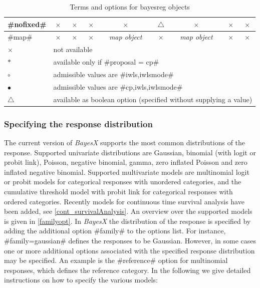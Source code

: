 \begin{table}
\begin{tabular}{|l||c|c|c|c|c|c|c|c|}
\hline
#nofixed#   & $\times$   & $\times$   & $\times$ & $\times$ & $\triangle$ & $\times$ & $\times$ & $\times$\\
\hline
#map#      & $\times$   & $\times$     & $\times$  & {\em map object}  & $\times$  & {\em map object} & $\times$ & $\times$ \\
\hline \hline
$\times$    & \multicolumn{8}{l|}{not available} \\
\hline
$\ast$  & \multicolumn{8}{l|}{available only if #proposal = cp#} \\
\hline
$\circ$  & \multicolumn{8}{l|}{admissible values are #iwls,iwlsmode#} \\
\hline
$\bullet$  & \multicolumn{8}{l|}{admissible values are #cp,iwls,iwlsmode#} \\
\hline
$\triangle$   & \multicolumn{8}{l|}{available as boolean option (specified without supplying a value)} \\
\hline

\end{tabular}
{\em\centering \caption{\label{termsoptions} Terms and options for
bayesreg objects}}
\end{table}

\clearpage

\subsubsection{Specifying the response distribution}
\label{familysyntax}

The current version of {\em BayesX} supports the most common
distributions of the response. Supported univariate distributions
are Gaussian, binomial (with logit or probit link), Poisson,
negative binomial, gamma, zero inflated Poisson and zero inflated
negative binomial. Supported multivariate models are
multinomial logit or probit models for categorical responses with
unordered categories, and the cumulative threshold model with
probit link for categorical responses with ordered categories.
Recently models for continuous time survival analysis have been
added, see \autoref{cont_survivalAnalysis}. An overview over the
supported models is given in \autoref{familyopt}. In {\em BayesX}
the distribution of the response is specified by adding the
additional option #family# to the options list. For instance,
#family=gaussian# defines the responses to be Gaussian. However,
in some cases one or more additional options associated with the
specified response distribution may be specified. An example is
the #reference# option for multinomial responses, which defines
the reference category. In the following we give detailed
instructions on how to specify the various models:

